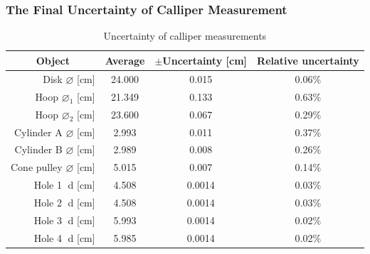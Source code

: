 \documentclass[12pt]{article}
\begin{document}
\subsubsection{The Final Uncertainty of Calliper Measurement}
\begin{table}[H]
\centering
\begin{tabular}{|r|c|c|c|}
\hline
\multicolumn{1}{|c|}{Object}                           & Average & $\pm$Uncertainty {[}cm{]} & Relative uncertainty \\ \hline
Disk $\varnothing$ {[}cm{]}        & 24.000  & 0.015                     & 0.06\%               \\ \hline
Hoop $\varnothing_1$ {[}cm{]}      & 21.349  & 0.133                     & 0.63\%               \\ \hline
Hoop $\varnothing_2$ {[}cm{]}      & 23.600  & 0.067                     & 0.29\%               \\ \hline
Cylinder A $\varnothing$ {[}cm{]}  & 2.993   & 0.011                     & 0.37\%               \\ \hline
Cylinder B $\varnothing$ {[}cm{]}  & 2.989   & 0.008                     & 0.26\%               \\ \hline
Cone pulley $\varnothing$ {[}cm{]} & 5.015   & 0.007                     & 0.14\%               \\ \hline
Hole \textcircled{1} d {[}cm{]}  & 4.508   & 0.0014                    & 0.03\%               \\ \hline
Hole \textcircled{2} d {[}cm{]}  & 4.508   & 0.0014                    & 0.03\%               \\ \hline
Hole \textcircled{3} d {[}cm{]}  & 5.993   & 0.0014                    & 0.02\%               \\ \hline
Hole \textcircled{4} d {[}cm{]}  & 5.985   & 0.0014                    & 0.02\%               \\ \hline
\end{tabular}
\caption{Uncertainty of calliper measurements}
\end{table}	
\end{document}

